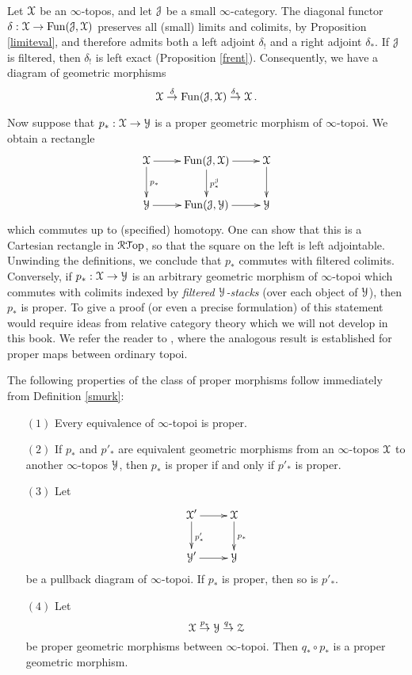 \begin{remark}\label{swurk}
Let $\operatorname{\mathcal{X}}$ be an $\infty$-topos, and let $\operatorname{\mathcal{J}}$ be a small $\infty$-category.
The diagonal functor $\delta: \operatorname{\mathcal{X}} \rightarrow \operatorname{Fun}(\operatorname{\mathcal{J}}, \operatorname{\mathcal{X}})$ preserves all (small) limits and colimits, by Proposition \ref{limiteval}, and therefore admits both a left adjoint $\delta_{!}$ and a right adjoint $\delta_{\ast}$. If $\operatorname{\mathcal{J}}$ is filtered, then $\delta_{!}$ is left exact (Proposition \ref{frent}). Consequently, we have a diagram of geometric morphisms
$$ \operatorname{\mathcal{X}} \stackrel{ \delta }{\rightarrow} \operatorname{Fun}(\operatorname{\mathcal{J}},\operatorname{\mathcal{X}}) \stackrel{ \delta_{\ast} }{\rightarrow} \operatorname{\mathcal{X}}. $$

Now suppose that $p_{\ast}: \operatorname{\mathcal{X}} \rightarrow \operatorname{\mathcal{Y}}$ is a proper geometric morphism of $\infty$-topoi. We obtain a rectangle
$$ \xymatrix{ \calX \ar[r] \ar[d]^{p_{\ast}} & \Fun(\calJ, \calX) \ar[d]^{p_{\ast}^{\calJ}} \ar[r] & \calX \ar[d] \\
\calY \ar[r] & \Fun(\calJ, \calY) \ar[r] & \calY }$$ 
which commutes up to (specified) homotopy. One can show that this is a Cartesian
rectangle in $\operatorname{\mathcal{R}{\mathcal T}op}$, so that the square on the left is left adjointable.
Unwinding the definitions, we conclude that $p_{\ast}$ commutes with filtered colimits. 
Conversely, if
$p_{\ast}: \operatorname{\mathcal{X}} \rightarrow \operatorname{\mathcal{Y}}$ is an arbitrary geometric morphism of $\infty$-topoi which
commutes with colimits indexed by {\em filtered $\operatorname{\mathcal{Y}}$-stacks} (over each object of $\operatorname{\mathcal{Y}}$), then $p_{\ast}$ is proper. To give a proof (or even a precise formulation) of this statement would require ideas from relative category theory which we will not develop in this book. We refer the reader to \cite{moerdijk}, where the analogous result is established for proper maps between ordinary topoi.
\end{remark}

The following properties of the class of proper morphisms follow immediately from Definition \ref{smurk}:

\begin{proposition}\label{properties}
\begin{itemize}
\item[$(1)$] Every equivalence of $\infty$-topoi is proper.
\item[$(2)$] If $p_{\ast}$ and $p'_{\ast}$ are equivalent geometric morphisms from
an $\infty$-topos $\operatorname{\mathcal{X}}$ to another $\infty$-topos $\operatorname{\mathcal{Y}}$, then $p_{\ast}$ is proper if and only if $p'_{\ast}$ is proper.
\item[$(3)$] Let 
$$ \xymatrix{ \calX' \ar[d]^{p'_{\ast}} \ar[r] & \calX \ar[d]^{p_{\ast}} \\
\calY' \ar[r] & \calY }$$ be a pullback diagram of $\infty$-topoi. If
$p_{\ast}$ is proper, then so is $p'_{\ast}$.
\item[$(4)$] Let 
$$\operatorname{\mathcal{X}} \stackrel{p_{\ast}}{\rightarrow} \operatorname{\mathcal{Y}} \stackrel{q_{\ast}}{\rightarrow} \operatorname{\mathcal{Z}}$$
be proper geometric morphisms between $\infty$-topoi. Then $q_{\ast} \circ p_{\ast}$ is a 
proper geometric morphism.
\end{itemize}
\end{proposition}

